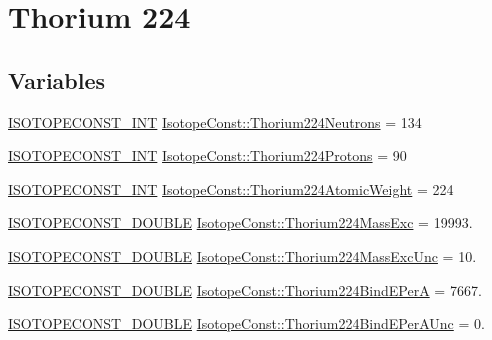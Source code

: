 \hypertarget{group___isotope_const-_thorium-_th224}{}\section{Thorium 224}
\label{group___isotope_const-_thorium-_th224}
\subsection*{Variables}
\begin{DoxyCompactItemize}
\item 
\mbox{\hyperlink{group___isotope_const-_macros_ga5f18360b3e99483a35c32d789e62621c}{I\+S\+O\+T\+O\+P\+E\+C\+O\+N\+S\+T\+\_\+\+I\+NT}} \mbox{\hyperlink{group___isotope_const-_thorium-_th224_ga548e51d40c19c206066aea992b853010}{Isotope\+Const\+::\+Thorium224\+Neutrons}} = 134
\item 
\mbox{\hyperlink{group___isotope_const-_macros_ga5f18360b3e99483a35c32d789e62621c}{I\+S\+O\+T\+O\+P\+E\+C\+O\+N\+S\+T\+\_\+\+I\+NT}} \mbox{\hyperlink{group___isotope_const-_thorium-_th224_gaed88f5009858592a1c53cb3e6851217b}{Isotope\+Const\+::\+Thorium224\+Protons}} = 90
\item 
\mbox{\hyperlink{group___isotope_const-_macros_ga5f18360b3e99483a35c32d789e62621c}{I\+S\+O\+T\+O\+P\+E\+C\+O\+N\+S\+T\+\_\+\+I\+NT}} \mbox{\hyperlink{group___isotope_const-_thorium-_th224_gaaf26161e3f088320de6851ae0ae28f27}{Isotope\+Const\+::\+Thorium224\+Atomic\+Weight}} = 224
\item 
\mbox{\hyperlink{group___isotope_const-_macros_ga8f45a7272ce02c0b4c65c44636ed719a}{I\+S\+O\+T\+O\+P\+E\+C\+O\+N\+S\+T\+\_\+\+D\+O\+U\+B\+LE}} \mbox{\hyperlink{group___isotope_const-_thorium-_th224_gae2270309f23b207e274ff69a0dbd9127}{Isotope\+Const\+::\+Thorium224\+Mass\+Exc}} = 19993.
\item 
\mbox{\hyperlink{group___isotope_const-_macros_ga8f45a7272ce02c0b4c65c44636ed719a}{I\+S\+O\+T\+O\+P\+E\+C\+O\+N\+S\+T\+\_\+\+D\+O\+U\+B\+LE}} \mbox{\hyperlink{group___isotope_const-_thorium-_th224_ga78d1a85ad20ea9a08fb0b904ee1464ea}{Isotope\+Const\+::\+Thorium224\+Mass\+Exc\+Unc}} = 10.
\item 
\mbox{\hyperlink{group___isotope_const-_macros_ga8f45a7272ce02c0b4c65c44636ed719a}{I\+S\+O\+T\+O\+P\+E\+C\+O\+N\+S\+T\+\_\+\+D\+O\+U\+B\+LE}} \mbox{\hyperlink{group___isotope_const-_thorium-_th224_ga63ea97049204c4acf2021a97ed9e10d4}{Isotope\+Const\+::\+Thorium224\+Bind\+E\+PerA}} = 7667.
\item 
\mbox{\hyperlink{group___isotope_const-_macros_ga8f45a7272ce02c0b4c65c44636ed719a}{I\+S\+O\+T\+O\+P\+E\+C\+O\+N\+S\+T\+\_\+\+D\+O\+U\+B\+LE}} \mbox{\hyperlink{group___isotope_const-_thorium-_th224_gae00dc7ae05e867c3d1dc7c1f79836d64}{Isotope\+Const\+::\+Thorium224\+Bind\+E\+Per\+A\+Unc}} = 0.

\end{DoxyCompactItemize}
